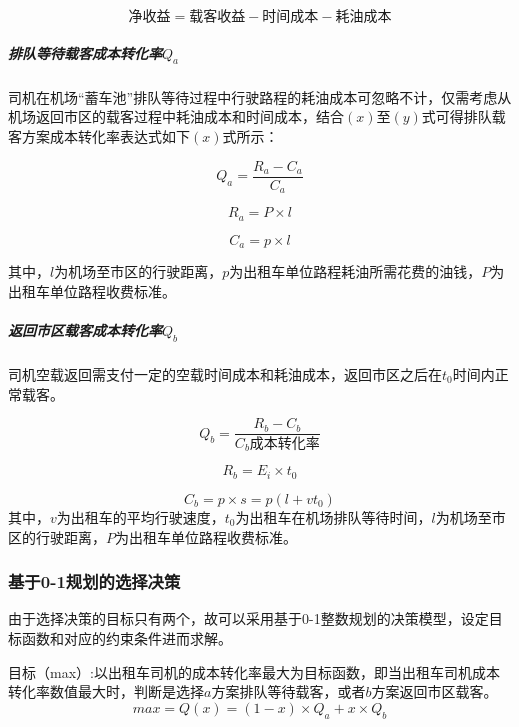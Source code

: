 \documentclass[withoutpreface,bwprint]{cumcmthesis} %
\begin{document}
\begin{equation}
\mbox{净收益}=\mbox{载客收益}-\mbox{时间成本}-\mbox{耗油成本}
\end{equation}


\subparagraph{排队等待载客成本转化率$Q_a$}司机在机场“蓄车池”排队等待过程中行驶路程的耗油成本可忽略不计，仅需考虑从机场返回市区的载客过程中耗油成本和时间成本，结合$(x)$至$(y)$式可得排队载客方案成本转化率表达式如下$(x)$式所示：

\begin{equation}
Q_a=\frac{R_a-C_a}{C_a} 
\end{equation}

\begin{equation}
R_a=P \times l
\end{equation}

\begin{equation}
C_a=p \times l 
\end{equation}

其中，$l$为机场至市区的行驶距离，$p$为出租车单位路程耗油所需花费的油钱，$P$为出租车单位路程收费标准。

\subparagraph{返回市区载客成本转化率$Q_b$}司机空载返回需支付一定的空载时间成本和耗油成本，返回市区之后在$t_0$时间内正常载客。

\begin{equation}
Q_b=\frac{R_b-C_b}{C_b成本转化率} 
\end{equation}

\begin{equation}
R_b=E_i \times t_0
\end{equation}

\begin{equation}
C_b=p \times s=p  ( l+v t_0 ) 
\end{equation}
其中，$v$为出租车的平均行驶速度，$t_0$为出租车在机场排队等待时间，$l$为机场至市区的行驶距离，$P$为出租车单位路程收费标准。

\subsubsection{基于0-1规划的选择决策}由于选择决策的目标只有两个，故可以采用基于0-1整数规划的决策模型，设定目标函数和对应的约束条件进而求解。


目标（max）:以出租车司机的成本转化率最大为目标函数，即当出租车司机成本转化率数值最大时，判断是选择$a$方案排队等待载客，或者$b$方案返回市区载客。
\begin{equation}
 max=Q(x)=(1-x)\times Q_a+x \times Q_b
\end{equation}
\end{document}

